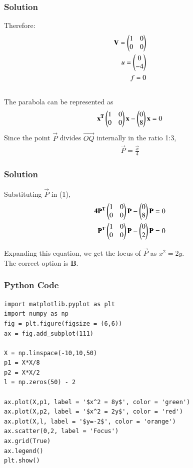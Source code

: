 \documentclass{beamer}
\begin{document}
\begin{frame}[fragile]
    \frametitle{Solution}
Therefore:
\begin{align*}
    \mathbf{V} = \begin{pmatrix} 1 & 0\\ 0 & 0\end{pmatrix}\\
    u = \begin{pmatrix}0\\-4\end{pmatrix}\\
    f = 0
\end{align*}\\
The parabola can be represented as \begin{align} \mathbf{x^T}\begin{pmatrix}1 & 0\\ 0 & 0\end{pmatrix}\mathbf{x} - \begin{pmatrix}0\\8\end{pmatrix}\mathbf{x} = 0\end{align}Since the point $\vec{P}$ divides $\vec{OQ}$ internally in the ratio 1:3, \begin{align}\vec{P} = \frac{\vec{x}}{4}\end{align}

\end{frame}
\begin{frame}[fragile]
\frametitle{Solution}
Substituting $\vec{P}$ in (1), 
\begin{align}
\mathbf{4P^T}\begin{pmatrix}1 & 0\\ 0 & 0\end{pmatrix}\mathbf{P} - \begin{pmatrix}0\\8\end{pmatrix}\mathbf{P} = 0\\
\mathbf{P^T}\begin{pmatrix}1 & 0\\ 0 & 0\end{pmatrix}\mathbf{P} - \begin{pmatrix}0\\2\end{pmatrix}\mathbf{P} = 0
\end{align}

Expanding this equation, we get the locus of $\vec{P}$ as $x^2 = 2y$. \\

The correct option is \textbf{B}.
\end{frame}

\begin{frame}[fragile]
    \frametitle{Python Code}
    \begin{lstlisting}
import matplotlib.pyplot as plt
import numpy as np
fig = plt.figure(figsize = (6,6))
ax = fig.add_subplot(111)

X = np.linspace(-10,10,50)
p1 = X*X/8
p2 = X*X/2
l = np.zeros(50) - 2

ax.plot(X,p1, label = '$x^2 = 8y$', color = 'green')
ax.plot(X,p2, label = '$x^2 = 2y$', color = 'red')
ax.plot(X,l, label = '$y=-2$', color = 'orange')
ax.scatter(0,2, label = 'Focus')
ax.grid(True)
ax.legend()
plt.show()
\end{lstlisting}
\end{frame}
\end{document}
